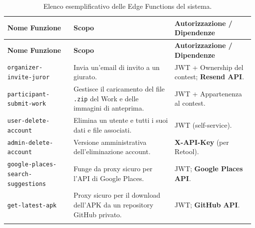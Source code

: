 \begin{longtable}{p{} p{} p{}}
    \toprule
    \textbf{Nome Funzione} & \textbf{Scopo} & \textbf{Autorizzazione / Dipendenze} \\
    \midrule
    \endfirsthead
    \toprule
    \textbf{Nome Funzione} & \textbf{Scopo} & \textbf{Autorizzazione / Dipendenze} \\
    \midrule
    \endhead
    \texttt{organizer-invite-juror} & Invia un'email di invito a un giurato.
    & JWT + Ownership del contest; \textbf{Resend API}. \\
    \texttt{participant-submit-work} & Gestisce il caricamento del file \texttt{.zip} del Work e delle immagini di anteprima.
    & JWT + Appartenenza al contest. \\
    \texttt{user-delete-account} & Elimina un utente e tutti i suoi dati e file associati.
    & JWT (self-service). \\
    \texttt{admin-delete-account} & Versione amministrativa dell'eliminazione account.
    & \textbf{X-API-Key} (per Retool). \\
    \texttt{google-places-search-suggestions} & Funge da proxy sicuro per l'API di Google Places.
    & JWT; \textbf{Google Places API}. \\
    \texttt{get-latest-apk} & Proxy sicuro per il download dell'APK da un repository GitHub privato.
    & JWT; \textbf{GitHub API}. \\
    \bottomrule
    \caption{Elenco esemplificativo delle Edge Functions del sistema.}
    \label{tab:edge_functions}
\end{longtable}

